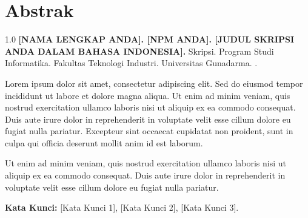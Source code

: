 \section*{Abstrak}
\thispagestyle{plain}

\justify
\begin{spacing}{1.0}
	\textbf{[NAMA LENGKAP ANDA]. [NPM ANDA]. [JUDUL SKRIPSI ANDA DALAM BAHASA INDONESIA].} Skripsi. Program Studi Informatika. Fakultas Teknologi Industri. Universitas Gunadarma. \the\year.
\end{spacing}

\vspace{0.5cm}

\justify
Lorem ipsum dolor sit amet, consectetur adipiscing elit. Sed do eiusmod tempor incididunt ut labore et dolore magna aliqua. Ut enim ad minim veniam, quis nostrud exercitation ullamco laboris nisi ut aliquip ex ea commodo consequat. Duis aute irure dolor in reprehenderit in voluptate velit esse cillum dolore eu fugiat nulla pariatur. Excepteur sint occaecat cupidatat non proident, sunt in culpa qui officia deserunt mollit anim id est laborum.

Ut enim ad minim veniam, quis nostrud exercitation ullamco laboris nisi ut aliquip ex ea commodo consequat. Duis aute irure dolor in reprehenderit in voluptate velit esse cillum dolore eu fugiat nulla pariatur.

\vspace{0.5cm}
\textbf{Kata Kunci:} [Kata Kunci 1], [Kata Kunci 2], [Kata Kunci 3].
